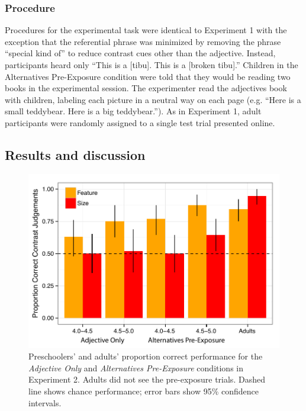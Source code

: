 \documentclass[man]{apa2}
\begin{document}
\subsubsection{Procedure}

Procedures for the experimental task were identical to Experiment 1 with the exception that the referential phrase was minimized by removing the phrase ``special kind of'' to reduce contrast cues other than the adjective.  Instead, participants heard only ``This is a [tibu]. This is a [broken tibu].''  Children in the Alternatives Pre-Exposure condition were told that they would be reading two books in the experimental session. The experimenter read the adjectives book with children, labeling each picture in a neutral way on each page (e.g. ``Here is a small teddybear. Here is a big teddybear.''). As in Experiment 1, adult participants were randomly assigned to a single test trial presented online.  

\subsection{Results and discussion}

\begin{figure}[t] 
  \begin{center} 
    \includegraphics[width=5in]{figures/expt2_mod.pdf} 
    \caption{\label{fig:expt2_kidsAdults} Preschoolers' and adults' proportion correct performance for the \emph{Adjective Only} and \emph{Alternatives Pre-Exposure} conditions in Experiment 2. Adults did not see the pre-exposure trials. Dashed line shows chance performance; error bars show 95\% confidence intervals.}
  \end{center} 
\end{figure}
\end{document}
